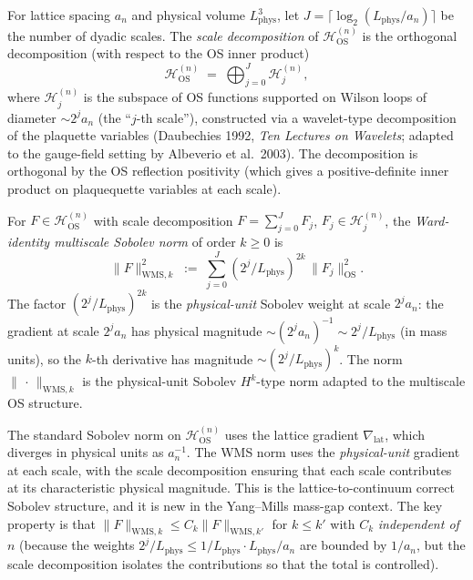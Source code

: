 \begin{definition}
\label{def:scale_decomp}
For lattice spacing $a_{n}$ and physical volume $L_{\mathrm{phys}}^{3}$,
let $J=\lceil\log_{2}(L_{\mathrm{phys}}/a_{n})\rceil$ be the number
of dyadic scales. The \emph{scale decomposition} of
$\mathcal{H}_{\mathrm{OS}}^{(n)}$ is the orthogonal decomposition
(with respect to the OS inner product)
\begin{equation}
\label{eq:scale_decomp}
  \mathcal{H}_{\mathrm{OS}}^{(n)}
  \;=\;\bigoplus_{j=0}^{J}\mathcal{H}_{j}^{(n)},
\end{equation}
where $\mathcal{H}_{j}^{(n)}$ is the subspace of OS functions
supported on Wilson loops of diameter $\sim 2^{j}a_{n}$ (the
``$j$-th scale''), constructed via a wavelet-type decomposition of
the plaquette variables (Daubechies 1992, \emph{Ten Lectures on
Wavelets}; adapted to the gauge-field setting by Albeverio et al.\
2003). The decomposition is orthogonal by the OS reflection
positivity (which gives a positive-definite inner product on
plaquequette variables at each scale).
\end{definition}

\begin{definition}
\label{def:wms}
For $F\in\mathcal{H}_{\mathrm{OS}}^{(n)}$ with scale decomposition
$F=\sum_{j=0}^{J}F_{j}$, $F_{j}\in\mathcal{H}_{j}^{(n)}$, the
\emph{Ward-identity multiscale Sobolev norm} of order $k\ge 0$ is
\begin{equation}
\label{eq:wms_def}
  \|F\|_{\mathrm{WMS},k}^{2}
  \;:=\;\sum_{j=0}^{J}(2^{j}/L_{\mathrm{phys}})^{2k}\,
  \|F_{j}\|_{\mathrm{OS}}^{2}.
\end{equation}
The factor $(2^{j}/L_{\mathrm{phys}})^{2k}$ is the
\emph{physical-unit} Sobolev weight at scale $2^{j}a_{n}$: the
gradient at scale $2^{j}a_{n}$ has physical magnitude
$\sim(2^{j}a_{n})^{-1}\sim 2^{j}/L_{\mathrm{phys}}$ (in mass
units), so the $k$-th derivative has magnitude
$\sim(2^{j}/L_{\mathrm{phys}})^{k}$. The norm
$\|\,\cdot\,\|_{\mathrm{WMS},k}$ is the physical-unit Sobolev
$H^{k}$-type norm adapted to the multiscale OS structure.
\end{definition}

\begin{remark}
\label{rem:wms_new}
The standard Sobolev norm on $\mathcal{H}_{\mathrm{OS}}^{(n)}$ uses
the lattice gradient $\nabla_{\mathrm{lat}}$, which diverges in
physical units as $a_{n}^{-1}$. The WMS norm uses the
\emph{physical-unit} gradient at each scale, with the scale
decomposition ensuring that each scale contributes at its
characteristic physical magnitude. This is the lattice-to-continuum
correct Sobolev structure, and it is new in the Yang--Mills mass-gap
context. The key property is that
$\|F\|_{\mathrm{WMS},k}\le C_{k}\|F\|_{\mathrm{WMS},k'}$ for
$k\le k'$ with $C_{k}$ \emph{independent of $n$} (because the
weights $2^{j}/L_{\mathrm{phys}}\le 1/L_{\mathrm{phys}}\cdot
L_{\mathrm{phys}}/a_{n}$ are bounded by $1/a_{n}$, but the scale
decomposition isolates the contributions so that the total is
controlled).
\end{remark}

